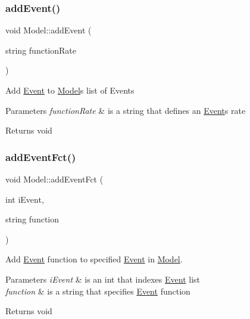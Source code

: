 \subsubsection{\texorpdfstring{add\+Event()}{addEvent()}}
{\footnotesize\ttfamily void Model\+::add\+Event (\begin{DoxyParamCaption}\item[{string}]{function\+Rate }\end{DoxyParamCaption})}

Add \hyperlink{class_event}{Event} to \hyperlink{class_model}{Model}\textquotesingle{}s list of Events


\begin{DoxyParams}{Parameters}
{\em function\+Rate} & is a string that defines an \hyperlink{class_event}{Event}\textquotesingle{}s rate \\
\hline
\end{DoxyParams}
\begin{DoxyReturn}{Returns}
void 
\end{DoxyReturn}
\mbox{\label{class_model_a78d9b07bd5e819215c9aeefabb4cede7}} 
\subsubsection{\texorpdfstring{add\+Event\+Fct()}{addEventFct()}}
{\footnotesize\ttfamily void Model\+::add\+Event\+Fct (\begin{DoxyParamCaption}\item[{int}]{i\+Event,  }\item[{string}]{function }\end{DoxyParamCaption})}



Add \hyperlink{class_event}{Event} function to specified \hyperlink{class_event}{Event} in \hyperlink{class_model}{Model}. 


\begin{DoxyParams}{Parameters}
{\em i\+Event} & is an int that indexes \hyperlink{class_event}{Event} list \\
\hline
{\em function} & is a string that specifies \hyperlink{class_event}{Event} function \\
\hline
\end{DoxyParams}
\begin{DoxyReturn}{Returns}
void 
\end{DoxyReturn}
\mbox{\label{class_model_a4743b4f267eeb1a60e21cc2995e1efcd}} 
